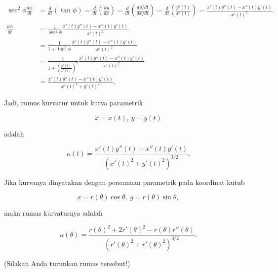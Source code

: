 \documentclass{article}
\newenvironment{eulernotebook}{\par}{\par}
\newenvironment{eulercomment}{\par\medskip}{\par\medskip}
\newenvironment{eulerformula}{}{}
\begin{document}
\begin{eulernotebook}
\begin{eulercomment}
\begin{eulercomment}
\begin{eulercomment}
\begin{eulercomment}
\begin{eulercomment}
\end{eulercomment}
\begin{eulerformula}
\[
\begin{aligned}\sec^2\phi\frac{d\phi}{dt} &= \frac{d}{dt}\left(\tan\phi\right)= \frac{d}{dt}\left(\frac{dy}{dx}\right)= \frac{d}{dt}\left(\frac{dy/dt}{dx/dt}\right)= \frac{d}{dt}\left(\frac{y'(t)}{x'(t)}\right)=\frac{x'(t)y''(t)-x''(t)y'(t)}{x'(t)^2}.\\ & \\ \frac{d\phi}{dt} &= \frac{1}{\sec^2\phi}\frac{x'(t)y''(t)-x''(t)y'(t)}{x'(t)^2}\\ &= \frac{1}{1+\tan^2\phi}\frac{x'(t)y''(t)-x''(t)y'(t)}{x'(t)^2}\\ &= \frac{1}{1+\left(\frac{y'(t)}{x'(t)}\right)^2}\frac{x'(t)y''(t)-x''(t)y'(t)}{x'(t)^2}\\ &= \frac{x'(t)y''(t)-x''(t)y'(t)}{x'(t)^2+y'(t)^2}.\end{aligned}
\]
\end{eulerformula}
\begin{eulercomment}
Jadi, rumus kurvatur untuk kurva parametrik

\end{eulercomment}
\begin{eulerformula}
\[
x=x(t),\ y=y(t)
\]
\end{eulerformula}
\begin{eulercomment}
adalah

\end{eulercomment}
\begin{eulerformula}
\[
\kappa(t) = \frac{x'(t)y''(t)-x''(t)y'(t)}{\left(x'(t)^2+y'(t)^2\right)^{3/2}}.
\]
\end{eulerformula}
\begin{eulercomment}
Jika kurvanya dinyatakan dengan persamaan parametrik pada koordinat
kutub

\end{eulercomment}
\begin{eulerformula}
\[
x=r(\theta)\cos\theta,\ y=r(\theta)\sin\theta,
\]
\end{eulerformula}
\begin{eulercomment}
maka rumus kurvaturnya adalah

\end{eulercomment}
\begin{eulerformula}
\[
\kappa(\theta) = \frac{r(\theta)^2+2r'(\theta)^2-r(\theta)r''(\theta)}{\left(r'(\theta)^2+r'(\theta)^2\right)^{3/2}}.
\]
\end{eulerformula}
\begin{eulercomment}
(Silakan Anda turunkan rumus tersebut!)


\end{eulercomment}
\end{eulercomment}
\end{eulercomment}
\end{eulercomment}
\end{eulercomment}
\end{eulernotebook}
\end{document}
